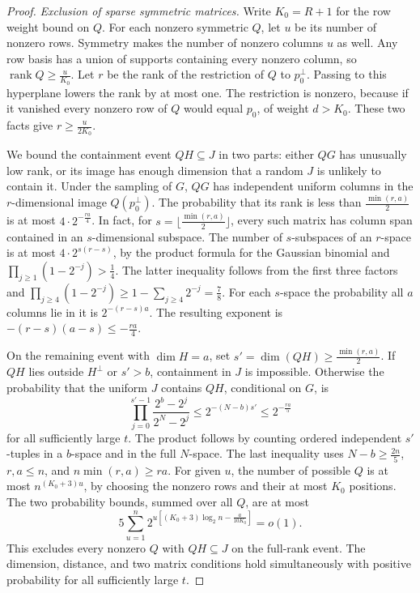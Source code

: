 \documentclass[aps,prl,reprint,notitlepage,nofootinbib,nobibnotes]{revtex4-2}
\begin{document}
\begin{proof}
\emph{Exclusion of sparse symmetric matrices.}
Write $K_0=R+1$ for the row weight bound on $Q$. For each nonzero symmetric $Q$, let $u$ be its
number of nonzero rows. Symmetry makes the number of nonzero columns $u$ as well. Any row basis has
a union of supports containing every nonzero column, so $\operatorname{rank}Q\ge \frac{u}{K_0}$.
Let $r$ be the rank of the restriction of $Q$ to $p_0^\perp$. Passing to this hyperplane lowers the
rank by at most one. The restriction is nonzero, because if it vanished every nonzero row of $Q$
would equal $p_0$, of weight $d>K_0$. These two facts give $r\ge \frac{u}{2K_0}$.

We bound the containment event $QH\subseteq J$ in two parts: either $QG$ has unusually low rank, or
its image has enough dimension that a random $J$ is unlikely to contain it. Under the sampling of
$G$, $QG$ has independent uniform columns in the $r$-dimensional image $Q(p_0^\perp)$. The
probability that its rank is less than $\frac{\min(r,a)}{2}$ is at most $4\cdot2^{-\frac{ra}{4}}$.
In fact, for $s=\lfloor\frac{\min(r,a)}{2}\rfloor$, every such matrix has column span contained in
an $s$-dimensional subspace. The number of $s$-subspaces of an $r$-space is at most
$4\cdot2^{s(r-s)}$, by the product formula for the Gaussian binomial and
$\prod_{j\ge1}(1-2^{-j})>\frac{1}{4}$. The latter inequality follows from the first three factors
and $\prod_{j\ge4}(1-2^{-j})\ge1-\sum_{j\ge4}2^{-j}=\frac{7}{8}$. For each $s$-space the
probability all $a$ columns lie in it is $2^{-(r-s)a}$. The resulting exponent is
$-(r-s)(a-s)\le-\frac{ra}{4}$.

On the remaining event with $\dim H=a$, set $s'=\dim(QH)\ge\frac{\min(r,a)}{2}$. If $QH$ lies
outside $H^\perp$ or $s'>b$, containment in $J$ is impossible. Otherwise the probability that the
uniform $J$ contains $QH$, conditional on $G$, is
\[
 \prod_{j=0}^{s'-1}\frac{2^b-2^j}{2^N-2^j}
 \le 2^{-(N-b)s'}
 \le 2^{-\frac{ra}{5}}
\]
for all sufficiently large $t$. The product follows by counting ordered independent $s'$-tuples in
a $b$-space and in the full $N$-space. The last inequality uses $N-b\ge\frac{2n}{5}$, $r,a\le n$,
and $n\min(r,a)\ge ra$. For given $u$, the number of possible $Q$ is at most $n^{(K_0+3)u}$, by
choosing the nonzero rows and their at most $K_0$ positions. The two probability bounds, summed
over all $Q$, are at most
\[
 5\sum_{u=1}^n
 2^{u[(K_0+3)\log_2 n-\frac{a}{10K_0}]}=o(1).
\]
This excludes every nonzero $Q$ with $QH\subseteq J$ on the full-rank event. The dimension,
distance, and two matrix conditions hold simultaneously with positive probability for all
sufficiently large $t$.
\end{proof}
\end{document}
